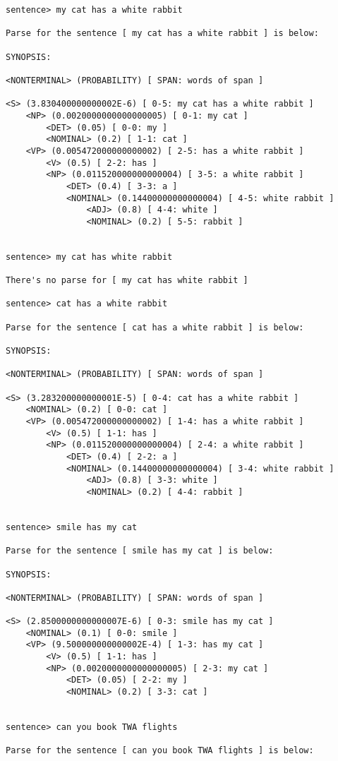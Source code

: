 \begin{verbatim}
sentence> my cat has a white rabbit

Parse for the sentence [ my cat has a white rabbit ] is below:

SYNOPSIS:

<NONTERMINAL> (PROBABILITY) [ SPAN: words of span ]

<S> (3.830400000000002E-6) [ 0-5: my cat has a white rabbit ]
    <NP> (0.0020000000000000005) [ 0-1: my cat ]
        <DET> (0.05) [ 0-0: my ]
        <NOMINAL> (0.2) [ 1-1: cat ]
    <VP> (0.005472000000000002) [ 2-5: has a white rabbit ]
        <V> (0.5) [ 2-2: has ]
        <NP> (0.011520000000000004) [ 3-5: a white rabbit ]
            <DET> (0.4) [ 3-3: a ]
            <NOMINAL> (0.14400000000000004) [ 4-5: white rabbit ]
                <ADJ> (0.8) [ 4-4: white ]
                <NOMINAL> (0.2) [ 5-5: rabbit ]


sentence> my cat has white rabbit

There's no parse for [ my cat has white rabbit ]

sentence> cat has a white rabbit

Parse for the sentence [ cat has a white rabbit ] is below:

SYNOPSIS:

<NONTERMINAL> (PROBABILITY) [ SPAN: words of span ]

<S> (3.283200000000001E-5) [ 0-4: cat has a white rabbit ]
    <NOMINAL> (0.2) [ 0-0: cat ]
    <VP> (0.005472000000000002) [ 1-4: has a white rabbit ]
        <V> (0.5) [ 1-1: has ]
        <NP> (0.011520000000000004) [ 2-4: a white rabbit ]
            <DET> (0.4) [ 2-2: a ]
            <NOMINAL> (0.14400000000000004) [ 3-4: white rabbit ]
                <ADJ> (0.8) [ 3-3: white ]
                <NOMINAL> (0.2) [ 4-4: rabbit ]


sentence> smile has my cat

Parse for the sentence [ smile has my cat ] is below:

SYNOPSIS:

<NONTERMINAL> (PROBABILITY) [ SPAN: words of span ]

<S> (2.8500000000000007E-6) [ 0-3: smile has my cat ]
    <NOMINAL> (0.1) [ 0-0: smile ]
    <VP> (9.500000000000002E-4) [ 1-3: has my cat ]
        <V> (0.5) [ 1-1: has ]
        <NP> (0.0020000000000000005) [ 2-3: my cat ]
            <DET> (0.05) [ 2-2: my ]
            <NOMINAL> (0.2) [ 3-3: cat ]


sentence> can you book TWA flights

Parse for the sentence [ can you book TWA flights ] is below:


\end{verbatim}
